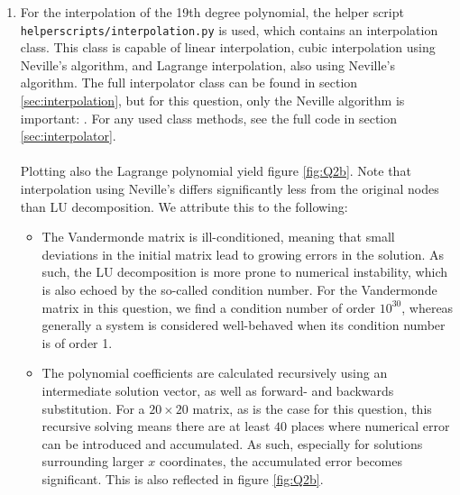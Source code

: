 \begin{enumerate}[label=(\alph*)]
\noindent
With a solution for $\bvec{c}$, a polynomial on 1000 equally-spaced points is created using

Plotting the polynomial, as well as the original nodes, yields figure \ref{fig:Q2a}
\begin{figure}[H]
    \centering
    \texttt{[image: ../figures/02\_vandermonde\_Q2a.png]}
    \caption{Polynomial found using LU decomposition of the Vandermonde matrix. Notice how the absolute difference with the initial points $y_i$ starts small, but grows for points at more positive $x$.}
    \label{fig:Q2a}
\end{figure}

\item For the interpolation of the 19th degree polynomial, the helper script \texttt{helperscripts/interpolation.py} is used, which contains an interpolation class. This class is capable of linear interpolation, cubic interpolation using Neville's algorithm, and Lagrange interpolation, also using Neville's algorithm. The full interpolator class can be found in section \ref{sec:interpolation}, but for this question, only the Neville algorithm is important:
.
For any used class methods, see the full code in section \ref{sec:interpolator}.\\
\\
Plotting also the Lagrange polynomial yield figure \ref{fig:Q2b}. Note that interpolation using Neville's differs significantly less from the original nodes than LU decomposition. We attribute this to the following:
\begin{itemize}
    \item The Vandermonde matrix is ill-conditioned, meaning that small deviations in the initial matrix lead to growing errors in the solution. As such, the LU decomposition is more prone to numerical instability, which is also echoed by the so-called condition number. For the Vandermonde matrix in this question, we find a condition number of order $10^30$, whereas generally a system is considered well-behaved when its condition number is of order 1. 
\item The polynomial coefficients are calculated recursively using an intermediate solution vector, as well as forward- and backwards substitution. For a $20\times20$ matrix, as is the case for this question, this recursive solving means there are at least $40$ places where numerical error can be introduced and accumulated. As such, especially for solutions surrounding larger $x$ coordinates, the accumulated error becomes significant. This is also reflected in figure \ref{fig:Q2b}.
\end{itemize}


\end{enumerate}
